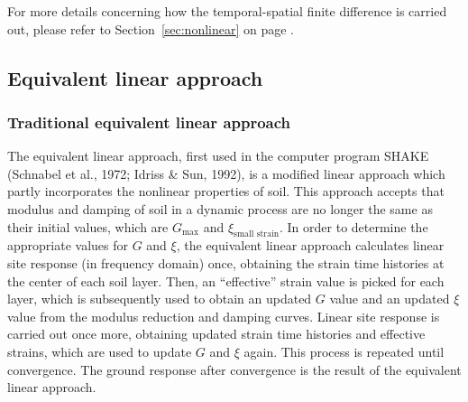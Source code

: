 \documentclass[11pt,letterpaper]{article}
\begin{document}
For more details concerning how the temporal-spatial finite difference is carried out, please refer to Section~\ref{sec:nonlinear} on page \pageref{sec:nonlinear}.


\subsection{Equivalent linear approach}\label{sec:equivalent-linear}

\subsubsection{Traditional equivalent linear approach}

The equivalent linear approach, first used in the computer program SHAKE (Schnabel et al., 1972; Idriss \& Sun, 1992), is a modified linear approach which partly incorporates the nonlinear properties of soil. This approach accepts that modulus and damping of soil in a dynamic process are no longer the same as their initial values, which are $G_{\text{max}}$ and $\xi_{\text{small strain}}$. In order to determine the appropriate values for $G$ and $\xi$, the equivalent linear approach calculates linear site response (in frequency domain) once, obtaining the strain time histories at the center of each soil layer. Then, an ``effective'' strain value is picked for each layer, which is subsequently used to obtain an updated $G$ value and an updated $\xi$ value from the modulus reduction and damping curves. Linear site response is carried out once more, obtaining updated strain time histories and effective strains, which are used to update $G$ and $\xi$ again.  This process is repeated until convergence. The ground response after convergence is the result of the equivalent linear approach.
\end{document}
